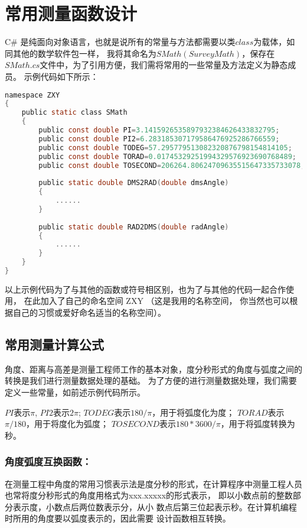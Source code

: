 
\chapter{常用测量函数设计}

C\# 是纯面向对象语言，也就是说所有的常量与方法都需要以类$class$为载体，如同其他的数学软件包一样，
我将其命名为$SMath(SurveyMath)$，保存在$SMath.cs$文件中，为了引用方便，我们需将常用的一些常量及方法定义为静态成员。
示例代码如下所示：
\begin{lstlisting}[language=C]
namespace ZXY
{
    public static class SMath
    {
        public const double PI=3.1415926535897932384626433832795;
        public const double PI2=6.283185307179586476925286766559;
        public const double TODEG=57.295779513082320876798154814105;
        public const double TORAD=0.01745329251994329576923690768489;
        public const double TOSECOND=206264.80624709635515647335733078;
    
        public static double DMS2RAD(double dmsAngle)
        {
            ......
        }
    
        public static double RAD2DMS(double radAngle)
        {
            ......
        }
    }
}
\end{lstlisting}

以上示例代码为了与其他的函数或符号相区别，也为了与其他的代码一起合作使用，
在此加入了自己的命名空间 ZXY （这是我用的名称空间，
你当然也可以根据自己的习惯或爱好命名适当的名称空间）。

\section{常用测量计算公式}
角度、距离与高差是测量工程师工作的基本对象，度分秒形式的角度与弧度之间的转换是我们进行测量数据处理的基础。
为了方便的进行测量数据处理，我们需要定义一些常量，如前述示例代码所示。

$PI$表示$\pi$, $PI2$表示$2\pi$;
$TODEG$表示$180/\pi$，用于将弧度化为度；
$TORAD$表示$\pi/180$，用于将度化为弧度；
$TOSECOND$表示$180*3600/\pi$，用于将弧度转换为秒。

\subsection{角度弧度互换函数：}

 在测量工程中角度的常用习惯表示法是度分秒的形式，在计算程序中测量工程人员也常将度分秒形式的角度用格式为xxx.xxxxx的形式表示，
 即以小数点前的整数部分表示度，小数点后两位数表示分，从小
 数点后第三位起表示秒。在计算机编程时所用的角度要以弧度表示的，因此需要
 设计函数相互转换。

